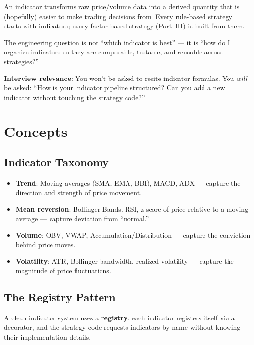 \documentclass[a4paper, 11pt]{report}
\theoremstyle{definition}
\theoremstyle{remark}
\begin{document}
An indicator transforms raw price/volume data into a derived quantity that is
(hopefully) easier to make trading decisions from.  Every rule-based strategy
starts with indicators; every factor-based strategy (Part~III) is built from
them.

The engineering question is not ``which indicator is best'' --- it is ``how do I
organize indicators so they are composable, testable, and reusable across
strategies?''

\textbf{Interview relevance}: You won't be asked to recite indicator formulas.
You \emph{will} be asked: ``How is your indicator pipeline structured?  Can you
add a new indicator without touching the strategy code?''

\section{Concepts}

\subsection{Indicator Taxonomy}

\begin{itemize}
    \item \textbf{Trend}: Moving averages (SMA, EMA, BBI), MACD, ADX ---
          capture the direction and strength of price movement.
    \item \textbf{Mean reversion}: Bollinger Bands, RSI, z-score of price
          relative to a moving average --- capture deviation from ``normal.''
    \item \textbf{Volume}: OBV, VWAP, Accumulation/Distribution --- capture the
          conviction behind price moves.
    \item \textbf{Volatility}: ATR, Bollinger bandwidth, realized volatility ---
          capture the magnitude of price fluctuations.
\end{itemize}

\subsection{The Registry Pattern}

A clean indicator system uses a \textbf{registry}: each indicator registers
itself via a decorator, and the strategy code requests indicators by name without
knowing their implementation details.
\end{document}
